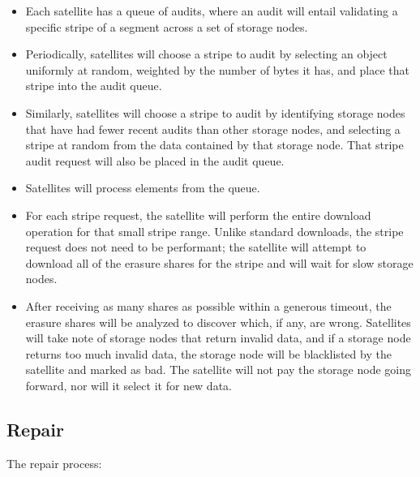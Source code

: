 \documentclass[11pt,fleqn,openany]{book}
\begin{document}
\begin{itemize}
\item Each satellite has a queue of audits, where an audit will entail
  validating a specific stripe of a segment across a set of storage nodes.
\item Periodically, satellites will choose a stripe to audit by selecting
  an object uniformly at random, weighted by the number of bytes it has,
and place that stripe into the audit queue.
\item Similarly, satellites will choose a stripe to audit by identifying
  storage nodes that have had fewer recent audits than other storage nodes, and
  selecting
  a stripe at random from the data contained by that storage node. That stripe
  audit
  request will also be placed in the audit queue.
\item Satellites will process elements from the queue.
\item For each stripe request, the satellite will perform the entire download
  operation for that small stripe range. Unlike standard downloads, the stripe
  request does not need to be performant; the satellite will attempt to
  download all of the erasure shares for the stripe and will wait for slow
  storage nodes.
\item After receiving as many shares as possible within a generous timeout,
  the erasure shares will be analyzed to discover which, if any, are wrong.
  Satellites will take note of storage nodes that return invalid data, and if
  a
  storage node returns too much invalid data, the storage node will be
  blacklisted by the
  satellite and marked as bad. The satellite will not pay the storage
  node going
  forward, nor will it select it for new data.
\end{itemize}

\subsection{Repair}

The repair process:
\end{document}
